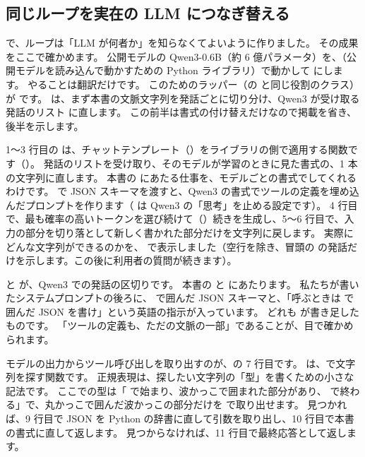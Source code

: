 \subsection{同じループを実在の LLM につなぎ替える}

で、ループは「LLM が何者か」を知らなくてよいように作りました。
その成果をここで確かめます。
公開モデルの Qwen3-0.6B\cite{yang2025qwen3}（約 6 億パラメータ）を、（公開モデルを読み込んで動かすための Python ライブラリ）で動かして  にします。
やることは翻訳だけです。
このためのラッパー（の  と同じ役割のクラス）が  です。
 は、まず本書の文脈文字列を発話ごとに切り分け、Qwen3 が受け取る発話のリスト  に直します。
この前半は書式の付け替えだけなので掲載を省き、後半を示します。


1〜3 行目の  は、チャットテンプレート（）をライブラリの側で適用する関数です（）。
発話のリストを受け取り、そのモデルが学習のときに見た書式の、1 本の文字列に直します。
本書の  にあたる仕事を、モデルごとの書式でしてくれるわけです。
 で JSON スキーマを渡すと、Qwen3 の書式でツールの定義を埋め込んだプロンプトを作ります（ は Qwen3 の「思考」を止める設定です）。
4 行目で、最も確率の高いトークンを選び続けて（）続きを生成し、5〜6 行目で、入力の部分を切り落として新しく書かれた部分だけを文字列に戻します。
実際にどんな文字列ができるのかを、 で表示しました（空行を除き、冒頭の  の発話だけを示します。この後に利用者の質問が続きます）。


 と  が、Qwen3 での発話の区切りです。
本書の  と  にあたります。
私たちが書いたシステムプロンプトの後ろに、 で囲んだ JSON スキーマと、「呼ぶときは  で囲んだ JSON を書け」という英語の指示が入っています。
どれも  が書き足したものです。
「ツールの定義も、ただの文脈の一部」であることが、目で確かめられます。

モデルの出力からツール呼び出しを取り出すのが、の 7 行目です。
 は、で文字列を探す関数です。
正規表現は、探したい文字列の「型」を書くための小さな記法です。
ここでの型は「 で始まり、波かっこで囲まれた部分があり、 で終わる」で、丸かっこで囲んだ波かっこの部分だけを  で取り出せます。
見つかれば、9 行目で JSON を Python の辞書に直して引数を取り出し、10 行目で本書の書式に直して返します。
見つからなければ、11 行目で最終応答として返します。

